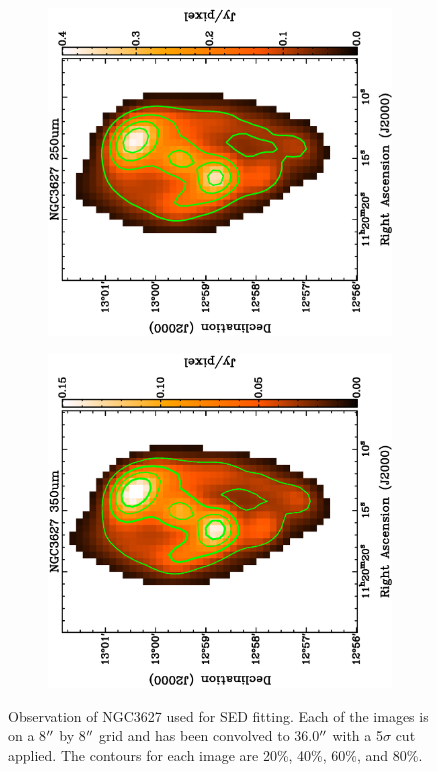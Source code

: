 \begin{figure}
  \begin{subfigure}[t]{0.48\textwidth}
    \centering
    \includegraphics[width=1.\linewidth, angle=270]{sed_imgs/250_sed.eps}
  \end{subfigure}
  \quad
  \begin{subfigure}[t]{0.48\textwidth}
    \centering
    \includegraphics[width=1.\linewidth, angle=270]{sed_imgs/350_sed.eps}
  \end{subfigure}
  
  \caption[NGC3627 Observations Used in SED Fitting]{Observation of NGC3627 used for SED fitting.  Each of the images is on a 8$\mbox{$^{\prime\prime}$}$ by 8$\mbox{$^{\prime\prime}$}$ grid and has been convolved to 36.0$\mbox{$^{\prime\prime}$}$ with a 5$\sigma$ cut applied.  The contours for each image are 20\%, 40\%, 60\%, and 80\%.} 
  \label{fig:images}
\end{figure}  

